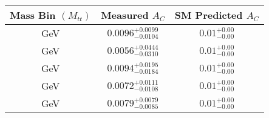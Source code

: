 \begin{tabular}{|c|c|c|} 
\hline
Mass Bin $(M_{tt})$ & Measured $A_C$ & SM Predicted $A_C$ \\ 
\hline
[1000,1500] GeV & $0.0096^{+0.0099}_{-0.0104}$ & $0.01^{+0.00}_{-0.00}$ \\ 
[0,500] GeV & $0.0056^{+0.0444}_{-0.0310}$ & $0.01^{+0.00}_{-0.00}$ \\ 
[1500,Inf] GeV & $0.0094^{+0.0195}_{-0.0184}$ & $0.01^{+0.00}_{-0.00}$ \\ 
[500,750] GeV & $0.0072^{+0.0111}_{-0.0108}$ & $0.01^{+0.00}_{-0.00}$ \\ 
[750,1000] GeV & $0.0079^{+0.0079}_{-0.0085}$ & $0.01^{+0.00}_{-0.00}$ \\ 
\hline
\end{tabular}
